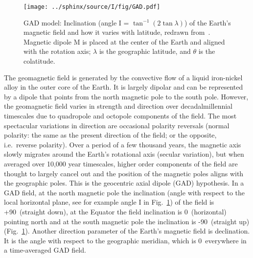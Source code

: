 \begin{figure}[!ht]
  \centering
    \texttt{[image: ../sphinx/source/I/fig/GAD.pdf]}
  \captionsetup{width=.95\textwidth}
  \caption[Geocentric axial dipole model]{GAD model: Inclination (angle I =
    $\tan^{-1}(2\tan\lambda)$) of the Earth's magnetic field and how it varies
    with latitude, redrawn from~\citet{B92,T08,T20}. Magnetic dipole M is placed
    at the center of the Earth and aligned with the rotation axis; $\lambda$ is
    the geographic latitude, and $\theta$ is the
    colatitude.}\label{Fig:chap_intro_gad}
\end{figure}

The geomagnetic field is generated by the convective flow of a liquid
iron-nickel alloy in the outer core of the Earth. It is largely dipolar and can
be represented by a dipole that points from the north magnetic pole to the south
pole. However, the geomagnetic field varies in strength and direction over
decadal\textendash{}millennial timescales due to quadropole and octopole
components of the field. The most spectacular variations in direction are
occasional polarity reversals (normal polarity: the same as the present
direction of the field; or the opposite, i.e.\ reverse polarity). Over a period
of a few thousand years, the magnetic axis slowly migrates around the Earth's
rotational axis (secular variation), but when averaged over 10,000 year
timescales, higher order components of the field are thought to largely cancel
out and the position of the magnetic poles aligns with the geographic poles.
This is the geocentric axial dipole (GAD) hypothesis. In a GAD field, at the
north magnetic pole the inclination (angle with respect to the local horizontal
plane, see for example angle I in Fig.~\ref{Fig:chap_intro_gad}) of the field is
+90\degree\ (straight down), at the Equator the field inclination is 0\degree\
(horizontal) pointing north and at the south magnetic pole the inclination is
-90\degree\ (straight up) (Fig.~\ref{Fig:chap_intro_gad}). Another direction
parameter of the Earth's magnetic field is declination. It is the angle with
respect to the geographic meridian, which is 0\degree\ everywhere in a
time-averaged GAD field.

